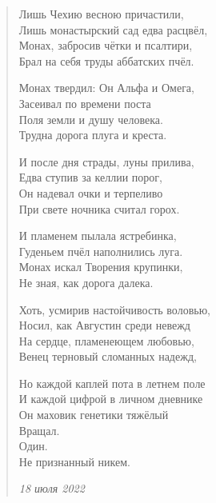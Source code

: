 \documentclass[a4paper,12pt,fleqn]{book}\usepackage{polyglossia}\setdefaultlanguage[babelshorthands=true]{russian}\setotherlanguage{english}\defaultfontfeatures{Ligatures=TeX,Mapping=tex-text}\usepackage{xcolor}\newcommand{\ml}[3]{#2}
\begin{document}
\begin{verse}
Лишь Чехию весною причастили,\\
Лишь монастырский сад едва расцвёл,\\
Монах, забросив чётки и псалтири,\\
Брал на себя труды аббатских пчёл.

Монах твердил: Он Альфа и Омега,\\
Засеивал по времени поста\\
Поля земли и душу человека.\\
Трудна дорога плуга и креста.

И после дня страды, луны прилива,\\
Едва ступив за келлии порог,\\
Он надевал очки и терпеливо\\
При свете ночника считал горох.

И пламенем пылала ястребинка,\\
Гуденьем пчёл наполнились луга.\\
Монах искал Творения крупинки,\\
Не зная, как дорога далека.

Хоть, усмирив настойчивость воловью,\\
Носил, как Августин среди невежд\\
На сердце, пламенеющем любовью,\\
Венец терновый сломанных надежд,

Но каждой каплей пота в летнем поле\\
И каждой цифрой в личном дневнике\\
Он маховик генетики тяжёлый\\
Вращал.\\
Один.\\
Не признанный никем.

\emph{18 июля 2022}

\end{verse}
\end{document}
